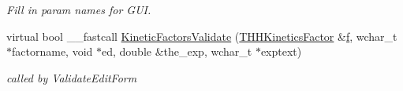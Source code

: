 \begin{DoxyCompactItemize}
\begin{DoxyCompactList}\small\item\em Fill in param names for G\+U\+I. \end{DoxyCompactList}\item 
\hypertarget{class_t_h_h_kinetics_factor_a91c1a746e5733ea17603417227422e4a}{virtual bool \+\_\+\+\_\+fastcall \hyperlink{class_t_h_h_kinetics_factor_a91c1a746e5733ea17603417227422e4a}{Kinetic\+Factors\+Validate} (\hyperlink{class_t_h_h_kinetics_factor}{T\+H\+H\+Kinetics\+Factor} \&\hyperlink{class_t_h_h_kinetics_factor_aa58fa2b2da61a14dd674f22d32a62248}{f}, wchar\+\_\+t $\ast$factorname, void $\ast$ed, double \&the\+\_\+exp, wchar\+\_\+t $\ast$exptext)}\label{class_t_h_h_kinetics_factor_a91c1a746e5733ea17603417227422e4a}

\begin{DoxyCompactList}\small\item\em called by Validate\+Edit\+Form \end{DoxyCompactList}\end{DoxyCompactItemize}
